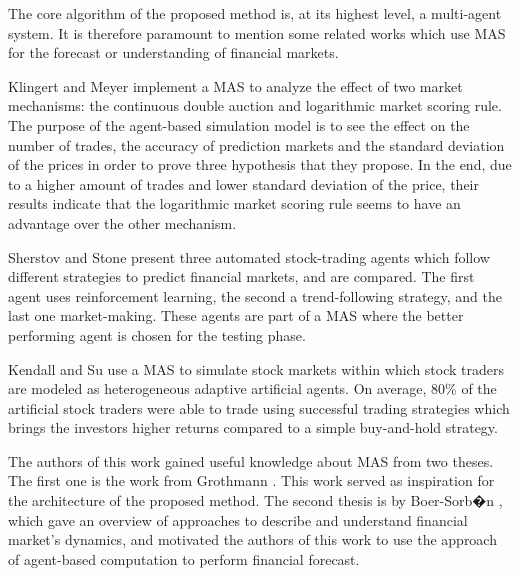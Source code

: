 \documentclass[a4paper,twoside]{article}
\begin{document}


The core algorithm of the proposed method is, at its highest level, a
multi-agent system. It is therefore paramount to mention some related
works which use MAS for the forecast or understanding of financial
markets. 

Klingert and Meyer \cite{Klingert_2012} implement a MAS to analyze the
effect of two market mechanisms: the continuous double auction and
logarithmic market scoring rule. The purpose of the agent-based
simulation model is to see the effect on the number of trades, the
accuracy of prediction markets and the standard deviation of the
prices in order to prove three hypothesis that they propose. In the
end, due to a higher amount of trades and lower standard deviation of
the price, their results indicate that the logarithmic market scoring
rule seems to have an advantage over the other mechanism. 

Sherstov and Stone \cite{Sherstov2005} present three automated
stock-trading agents which follow different strategies to predict
financial markets, and are compared. The first agent uses
reinforcement learning, the second a trend-following strategy, and the
last one market-making. These agents are part of a MAS where the
better performing agent is chosen for the testing phase. 

Kendall and Su \cite{Kendall2003} use a MAS to simulate stock markets
within which stock traders are modeled as heterogeneous adaptive
artificial agents. On average, 80\% of the artificial stock traders
were able to trade using successful trading strategies which brings
the investors higher returns compared to a simple buy-and-hold
strategy. 

The authors of this work gained useful knowledge about MAS from two
theses. The first one is the work from Grothmann
\cite{Grothmann2002}. This work served as inspiration for the
architecture of the proposed method. The second thesis is by
Boer-Sorb�n \cite{Boer-Sorban2008}, which gave an overview of
approaches to describe and understand financial market's dynamics, and
motivated the authors of this work to use the approach of agent-based
computation to perform financial forecast. 
\end{document}
